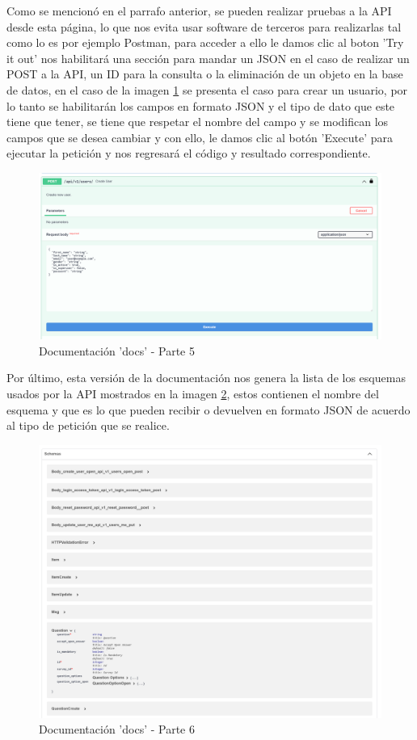 Como se mencionó en el parrafo anterior, se pueden realizar pruebas a la API desde esta página, lo que nos evita usar software de terceros para realizarlas tal como lo es por ejemplo Postman, para acceder a ello le damos clic al boton 'Try it out' nos habilitará una sección para mandar un JSON en el caso de realizar un POST a la API, un ID para la consulta o la eliminación de un objeto en la base de datos, en el caso de la imagen \ref{graphic:docs5} se presenta el caso para crear un usuario, por lo tanto se habilitarán los campos en formato JSON y el tipo de dato que este tiene que tener, se tiene que respetar el nombre del campo y se modifican los campos que se desea cambiar y  con ello, le damos clic al botón 'Execute' para ejecutar la petición y nos regresará el código y resultado correspondiente.

\begin{figure}[!htb]
    \centering
    \includegraphics[scale=.20]{TT/img/implementacion/docs_5.png}
    \caption{Documentación 'docs' - Parte 5}
    \label{graphic:docs5}
\end{figure}

Por último, esta versión de la documentación nos genera la lista de los esquemas usados por la API mostrados en la imagen \ref{graphic:docs6}, estos contienen el nombre del esquema y que es lo que pueden recibir o devuelven en formato JSON de acuerdo al tipo de petición que se realice.
\begin{figure}[!htb]
    \centering
    \includegraphics[scale=.20]{TT/img/implementacion/docs_6.png}
    \caption{Documentación 'docs' - Parte 6}
    \label{graphic:docs6}
\end{figure}

